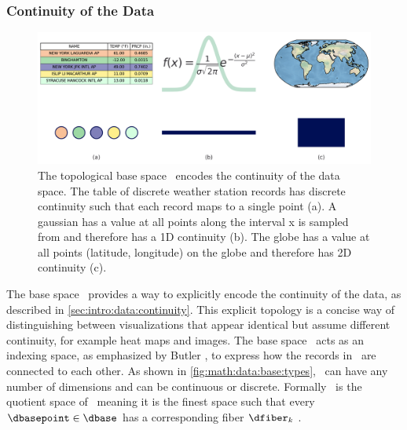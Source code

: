 \documentclass[../main.tex]{subfiles}
\begin{document}
\subsubsection{Continuity of the Data} 
\label{sec:math:data:base}
\begin{figure}[H]
    \includegraphics[width=1\textwidth]{figures/math/k_different_types.png}
    \caption{The topological base space \dbase\ encodes the continuity of the data space. The table of discrete weather station records has discrete continuity such that each record maps to a single point (a). A gaussian has a value at all points along the interval x is sampled from and therefore has a 1D continuity (b). The globe has a value at all points (latitude, longitude) on the globe and therefore has 2D continuity (c). }
    \label{fig:math:data:base:types}
\end{figure}

The base space \dbase\ provides a way to explicitly encode the continuity of the data, as described in \autoref{sec:intro:data:continuity}. This explicit topology is a concise way of distinguishing between visualizations that appear identical but assume different continuity, for example heat maps and images. The base space \dbase\ acts as an indexing space, as emphasized by Butler \cite{butlerVectorBundleClassesForm1992,butlerVisualizationModelBased1989}, to express how the records in \dtotal\ are connected to each other. As shown in \autoref{fig:math:data:base:types}, \dbase\ can have any number of dimensions and can be continuous or discrete. Formally \dbase\ is the quotient space \cite{QuotientSpaceTopology2020} of \dtotal\, meaning it is the finest space \cite{aurouxMath131Introduction} such that every \(\dbasepoint \in \dbase\) has a corresponding fiber \(\dfiber_k\) \cite{QuotientSpaceTopology2020}. 
\end{document}

